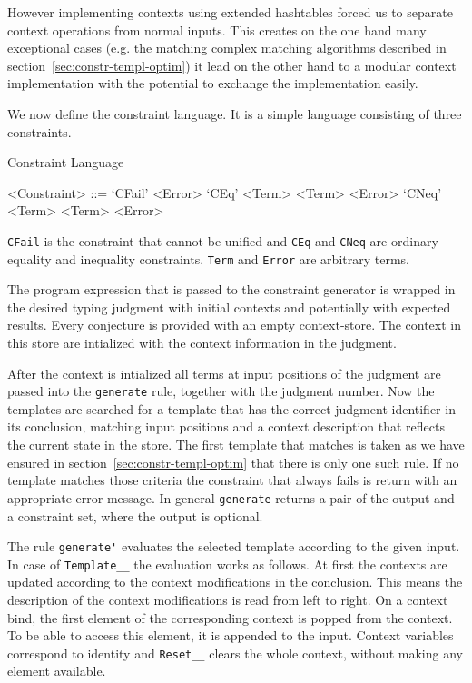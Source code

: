 However implementing contexts using extended hashtables forced us to
separate context operations from normal inputs. This creates on the
one hand many exceptional cases (e.g. the matching complex matching
algorithms described in section~\ref{sec:constr-templ-optim}) it lead
on the other hand to a modular context implementation with the
potential to exchange the implementation easily.

We now define the constraint language. It is a simple language
consisting of three constraints.

\begin{definition}{Constraint Language}
  \begin{grammar}
    <Constraint> ::= `CFail' <Error>
    \alt `CEq' <Term> <Term> <Error>
    \alt `CNeq' <Term> <Term> <Error>
  \end{grammar}
\end{definition}

\verb|CFail| is the constraint that cannot be unified and \verb|CEq|
and \verb|CNeq| are ordinary equality and inequality
constraints. \verb|Term| and \verb|Error| are arbitrary terms.

The program expression that is passed to the constraint generator is
wrapped in the desired typing judgment with initial contexts and
potentially with expected results. Every conjecture is provided with
an empty context-store. The context in this store are intialized with
the context information in the judgment.

After the context is intialized all terms at input positions of the
judgment are passed into the \verb|generate| rule, together with the
judgment number. Now the templates are searched for a template that has the
correct judgment identifier in its conclusion, matching input
positions and a context description that reflects the current state in
the store. The first template that matches is taken as we have ensured
in section~\ref{sec:constr-templ-optim} that there is only one such
rule. If no template matches those criteria the constraint that always
fails is return with an appropriate error message. In general
\verb|generate| returns a pair of the output and a constraint set,
where the output is optional. 

The rule \verb|generate'| evaluates the selected template according to
the given input. In case of \verb|Template__| the evaluation works as
follows. At first the contexts are updated according to the context
modifications in the conclusion. This means the description of the
context modifications is read from left to right. On a context bind,
the first element of the corresponding context is popped from the
context. To be able to access this element, it is appended to the
input. Context variables correspond to identity and \verb|Reset__|
clears the whole context, without making any element available.

